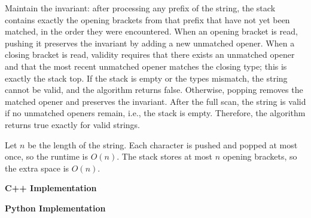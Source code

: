 \Correctness
Maintain the invariant: after processing any prefix of the string, the stack contains exactly
the opening brackets from that prefix that have not yet been matched, in the order they were
encountered.
When an opening bracket is read, pushing it preserves the invariant by adding a new unmatched
opener. When a closing bracket is read, validity requires that there exists an unmatched opener
and that the most recent unmatched opener matches the closing type; this is exactly the stack
top. If the stack is empty or the types mismatch, the string cannot be valid, and the algorithm
returns false. Otherwise, popping removes the matched opener and preserves the invariant.
After the full scan, the string is valid if no unmatched openers remain, i.e., the stack is empty.
Therefore, the algorithm returns true exactly for valid strings.

\Complexity
Let $n$ be the length of the string. Each character is pushed and popped at most once, so the
runtime is $O(n)$. The stack stores at most $n$ opening brackets, so the extra space is $O(n)$.

\bigskip
\noindent\textbf{C++ Implementation}



\bigskip
\noindent\textbf{Python Implementation}



\ProblemDivider
